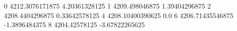 0 4212.3076171875 4.20361328125
1 4209.498046875 1.39404296875
2 4208.4404296875 0.33642578125
4 4208.10400390625 0.0
6 4206.71435546875 -1.3896484375
8 4204.42578125 -3.67822265625
